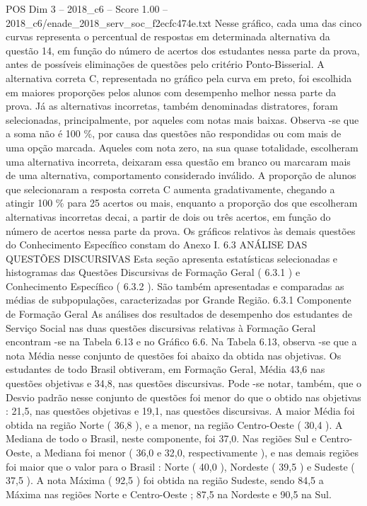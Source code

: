 \begin{textsample}{POS Dim 3 – 2018\_c6 – Score 1.00 – 2018\_c6/enade\_2018\_serv\_soc\_f2ecfc474e.txt}
Nesse gráfico, cada uma das cinco curvas representa o percentual de respostas em determinada alternativa da questão 14, em função do número de acertos dos estudantes nessa parte da prova, antes de possíveis eliminações de questões pelo critério Ponto-Bisserial.
A alternativa correta C, representada no gráfico pela curva em preto, foi escolhida em maiores proporções pelos alunos com desempenho melhor nessa parte da prova.
Já as alternativas incorretas, também denominadas distratores, foram selecionadas, principalmente, por aqueles com notas mais baixas.
Observa -se que a soma não é 100 \%, por causa das questões não respondidas ou com mais de uma opção marcada.
Aqueles com nota zero, na sua quase totalidade, escolheram uma alternativa incorreta, deixaram essa questão em branco ou marcaram mais de uma alternativa, comportamento considerado inválido.
A proporção de alunos que selecionaram a resposta correta C aumenta gradativamente, chegando a atingir 100 \% para 25 acertos ou mais, enquanto a proporção dos que escolheram alternativas incorretas decai, a partir de dois ou três acertos, em função do número de acertos nessa parte da prova.
Os gráficos relativos às demais questões do Conhecimento Específico constam do Anexo I. 6.3 ANÁLISE DAS QUESTÕES DISCURSIVAS Esta seção apresenta estatísticas selecionadas e histogramas das Questões Discursivas de Formação Geral ( 6.3.1 ) e Conhecimento Específico ( 6.3.2 ).
São também apresentadas e comparadas as médias de subpopulações, caracterizadas por Grande Região. 6.3.1 Componente de Formação Geral As análises dos resultados de desempenho dos estudantes de Serviço Social nas duas questões discursivas relativas à Formação Geral encontram -se na Tabela 6.13 e no Gráfico 6.6.
Na Tabela 6.13, observa -se que a nota Média nesse conjunto de questões foi abaixo da obtida nas objetivas.
Os estudantes de todo Brasil obtiveram, em Formação Geral, Média 43,6 nas questões objetivas e 34,8, nas questões discursivas.
Pode -se notar, também, que o Desvio padrão nesse conjunto de questões foi menor do que o obtido nas objetivas : 21,5, nas questões objetivas e 19,1, nas questões discursivas.
A maior Média foi obtida na região Norte ( 36,8 ), e a menor, na região Centro-Oeste ( 30,4 ).
A Mediana de todo o Brasil, neste componente, foi 37,0.
Nas regiões Sul e Centro-Oeste, a Mediana foi menor ( 36,0 e 32,0, respectivamente ), e nas demais regiões foi maior que o valor para o Brasil : Norte ( 40,0 ), Nordeste ( 39,5 ) e Sudeste ( 37,5 ).
A nota Máxima ( 92,5 ) foi obtida na região Sudeste, sendo 84,5 a Máxima nas regiões Norte e Centro-Oeste ; 87,5 na Nordeste e 90,5 na Sul.

\end{textsample}
